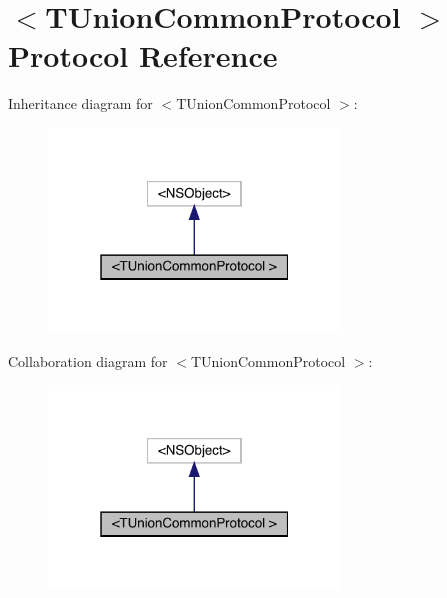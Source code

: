 \hypertarget{protocol_t_union_common_protocol_01-p}{}\section{$<$T\+Union\+Common\+Protocol $>$ Protocol Reference}
\label{protocol_t_union_common_protocol_01-p}


Inheritance diagram for $<$T\+Union\+Common\+Protocol $>$\+:\nopagebreak
\begin{figure}[H]
\begin{center}
\leavevmode
\includegraphics[width=220pt]{protocol_t_union_common_protocol_01-p__inherit__graph}
\end{center}
\end{figure}


Collaboration diagram for $<$T\+Union\+Common\+Protocol $>$\+:\nopagebreak
\begin{figure}[H]
\begin{center}
\leavevmode
\includegraphics[width=220pt]{protocol_t_union_common_protocol_01-p__coll__graph}
\end{center}
\end{figure}
